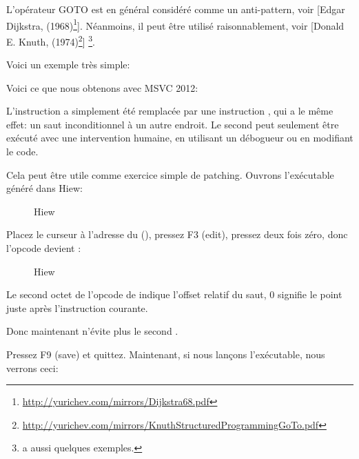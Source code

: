 
L'opérateur GOTO est en général considéré comme un anti-pattern, voir
[Edgar Dijkstra,  (1968)\footnote{\url{http://yurichev.com/mirrors/Dijkstra68.pdf}}].
Néanmoins, il peut être utilisé raisonnablement, voir
[Donald E. Knuth,  (1974)\footnote{\url{http://yurichev.com/mirrors/KnuthStructuredProgrammingGoTo.pdf}}]
\footnote{\InSqBrackets{\CNotes} a aussi quelques exemples.}.

Voici un exemple très simple:



Voici ce que nous obtenons avec MSVC 2012:



L'instruction  a simplement été remplacée par une instruction \JMP, qui
a le même effet: un saut inconditionnel à un autre endroit.
Le second \printf peut seulement être exécuté avec une intervention humaine, en
utilisant un débogueur ou en modifiant le code.

\par

\clearpage

Cela peut être utile comme exercice simple de patching. Ouvrons l'exécutable généré
dans Hiew:

\begin{figure}[H]
\centering
{}
\caption{Hiew}
\label{fig:goto_hiew1}
\end{figure}

\clearpage
Placez le curseur à l'adresse du \JMP (),
pressez F3 (edit), pressez deux fois zéro, donc l'opcode devient :

\begin{figure}[H]
\centering
{}
\caption{Hiew}
\label{fig:goto_hiew2}
\end{figure}

Le second octet de l'opcode de \JMP indique l'offset relatif du saut, 0 signifie
le point juste après l'instruction courante.

Donc maintenant \JMP n'évite plus le second \printf.

Pressez F9 (save) et quittez. Maintenant, si nous lançons l'exécutable, nous verrons
ceci:

